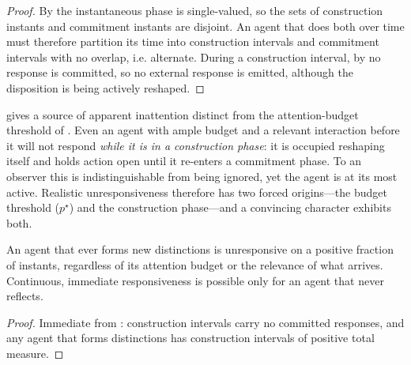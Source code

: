 \documentclass[11pt,twocolumn,a4paper]{article}
\begin{document}
\begin{proof}
By  the instantaneous phase is single-valued, so the
sets of construction instants and commitment instants are disjoint. An
agent that does both over time must therefore partition its time into
construction intervals and commitment intervals with no overlap, i.e.
alternate. During a construction interval, by  no
response is committed, so no external response is emitted, although the
disposition is being actively reshaped.
\end{proof}

\begin{remark}
\label{rem:second-distraction}
 gives a source of apparent inattention distinct
from the attention-budget threshold of . Even an agent
with ample budget and a relevant interaction before it will not respond
\emph{while it is in a construction phase}: it is occupied reshaping
itself and holds action open until it re-enters a commitment phase. To an
observer this is indistinguishable from being ignored, yet the agent is at
its most active. Realistic unresponsiveness therefore has two forced
origins---the budget threshold ($p^\star$) and the construction phase---and
a convincing character exhibits both.
\end{remark}

\begin{corollary}
An agent that ever forms new distinctions is unresponsive on a positive
fraction of instants, regardless of its attention budget or the relevance
of what arrives. Continuous, immediate responsiveness is possible only for
an agent that never reflects.
\end{corollary}

\begin{proof}
Immediate from : construction intervals carry no
committed responses, and any agent that forms distinctions has construction
intervals of positive total measure.
\end{proof}
\end{document}
